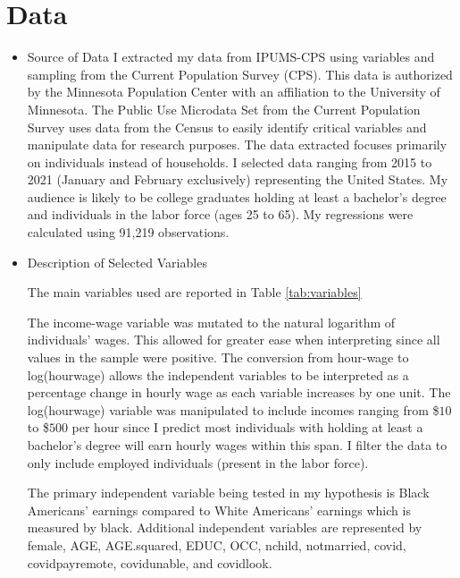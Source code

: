 \documentclass[12pt, english]{article}
\begin{document}
\section{Data}
\begin{itemize}
    \item Source of Data
    I extracted my data from IPUMS-CPS using variables and sampling from the Current Population Survey (CPS). This data is authorized by the Minnesota Population Center with an affiliation to the University of Minnesota. The Public Use Microdata Set from the Current Population Survey uses data from the Census to easily identify critical variables and manipulate data for research purposes. The data extracted focuses primarily on individuals instead of households. I selected data ranging from 2015 to 2021 (January and February exclusively) representing the United States. My audience is likely to be college graduates holding at least a bachelor’s degree and individuals in the labor force (ages 25 to 65). My regressions were calculated using 91,219 observations. 
    \item Description of Selected Variables
    
    The main variables used are reported in Table \ref{tab:variables}
    
    The income-wage variable was mutated to the natural logarithm of individuals’ wages. This allowed for greater ease when interpreting since all values in the sample were positive. The conversion from hour-wage to log(hourwage) allows the independent variables to be interpreted as a percentage change in hourly wage as each variable increases by one unit. The log(hourwage) variable was manipulated to include incomes ranging from \$$10$ to \$$500$ per hour since I predict most individuals with holding at least a bachelor’s degree will earn hourly wages within this span. I filter the data to only include employed individuals (present in the labor force). 

    The primary independent variable being tested in my hypothesis is Black Americans’ earnings compared to White Americans’ earnings which is measured by black. Additional independent variables are represented by female, AGE, AGE.squared, EDUC, OCC, nchild, notmarried, covid, covidpayremote, covidunable, and covidlook.


\end{itemize}
\end{document}
